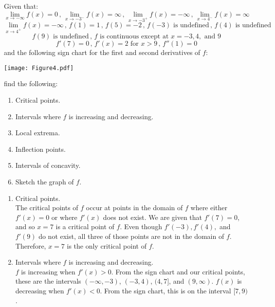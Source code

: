 \documentclass[nooutcomes]{ximera}
\begin{document}
\begin{problem}
Given that:
$$ \lim_{x \to - \infty} f(x) = 0 \, , \, \lim_{x \to -3^-} f(x) = \infty \, , \, \lim_{x \to -3^+} f(x) = - \infty \, , \, \lim_{x \to 4^-} f(x) = \infty $$
$$ \lim_{x \to 4^+} f(x) = -\infty \, , \, f(1) = 1 \, , \, f(5) = -2 \, , \, f(-3) \text{ is undefined} \, , \, f(4) \text{ is undefined} $$
$$ f(9) \text{ is undefined} \, , \, f \text{ is continuous except at } x=-3, 4, \text{ and } 9 $$
$$ f'(7) = 0 \, , \, f'(x) = 2 \text{ for } x > 9 \, , \, f''(1) = 0 $$
and the following sign chart for the first and second derivatives of $f$:

	\begin{image}
	\texttt{[image: Figure4.pdf]}
	\end{image}
	
find the following:
	\begin{enumerate}
	
	\item  Critical points.
	\item  Intervals where $f$ is increasing and decreasing.
	\item  Local extrema.
	\item  Inflection points.
	\item  Intervals of concavity.
	\item  Sketch the graph of $f$.
	
	\end{enumerate}
	
		\begin{freeResponse}
		
			\begin{enumerate}
			
			\item  Critical points. \\
			The critical points of $f$ occur at points in the domain of $f$ where either $f'(x)=0$ or where $f'(x)$ does not exist.  We are given that $f'(7)=0$, and so $x=7$ is a critical point of $f$.  Even though $f'(-3), f'(4),$ and $f'(9)$ do not exist, all three of those points are not in the domain of $f$.  Therefore, $x=7$ is the only critical point of $f$.  
			
			\item  Intervals where $f$ is increasing and decreasing.  \\
			$f$ is increasing when $f'(x)>0$.  From the sign chart and our critical points, these are the intervals $(-\infty ,-3)$, $(-3,4)$, $(4,7]$, and $(9,\infty )$. 
$f(x)$ is decreasing when $f'(x)<0$.  From the sign chart, this is on the interval $[7,9)$.
			

\end{enumerate}
\end{freeResponse}
\end{problem}
\end{document}
